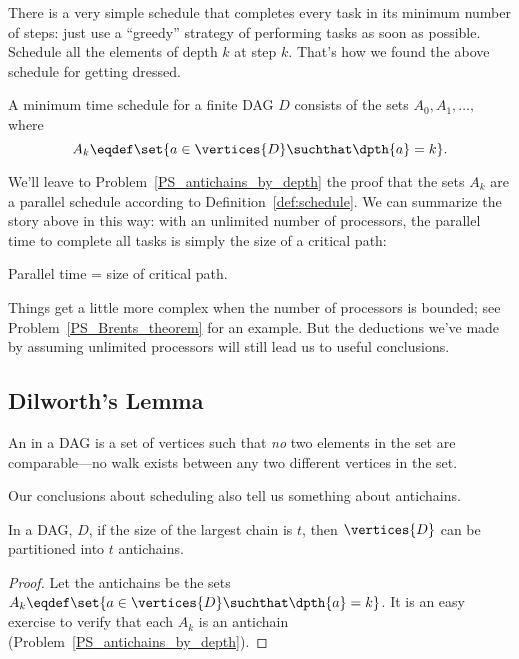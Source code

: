 There is a very simple schedule that completes every task in its
minimum number of steps: just use a ``greedy'' strategy of performing
tasks as soon as possible.  Schedule all the elements of depth
$k$ at step $k$.  That's how we found the above schedule for getting dressed.

\begin{theorem}\label{thm:parallel-time}
A minimum time schedule for a finite DAG $D$ consists of the sets
$A_0, A_1,\dots,$ where
\[
A_k \eqdef \set{a \in \vertices{D} \suchthat \dpth{a} =k}.
\]
\end{theorem}

We'll leave to Problem~\ref{PS_antichains_by_depth} the proof that the
sets $A_k$ are a parallel schedule according to
Definition~\ref{def:schedule}.  We can summarize the story above in
this way: with an unlimited number of processors, the parallel time to
complete all tasks is simply the size of a critical path:

\begin{corollary}\label{cor:critical-path-time}
Parallel time = size of critical path.
\end{corollary}

Things get a little more complex when the number of processors is
bounded; see Problem~\ref{PS_Brents_theorem} for an example.  But the
deductions we've made by assuming unlimited processors will still lead
us to useful conclusions.

\subsection{Dilworth's Lemma}\label{dilworth_subsec}

\begin{definition}
An  in a DAG is a set of vertices such that \emph{no}
two elements in the set are comparable---no walk exists between any
two different vertices in the set.
\end{definition}

Our conclusions about scheduling also tell us something about antichains.

\begin{corollary}\label{cor:parallel}
In a DAG, $D$, if the size of the largest chain is $t$, then
$\vertices{D}$ can be partitioned into $t$ antichains.
\end{corollary}

\begin{proof}
Let the antichains be the sets $A_k \eqdef \set{a \in \vertices{D}
  \suchthat \dpth{a} =k}$.  It is an easy exercise to verify that each
$A_k$ is an antichain (Problem~\ref{PS_antichains_by_depth}).
\end{proof}

